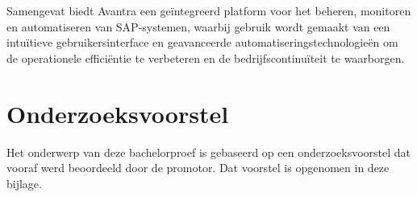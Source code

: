 \documentclass[dutch,dit,thesis]{hogentreport}
\begin{document}
Samengevat biedt Avantra een geïntegreerd platform voor het beheren, monitoren en automatiseren van SAP-systemen, waarbij gebruik wordt gemaakt van een intuïtieve gebruikersinterface en geavanceerde 
automatiseringstechnologieën om de operationele efficiëntie te verbeteren en de bedrijfscontinuïteit te waarborgen.




%
%

%


\appendix

\chapter{Onderzoeksvoorstel}

Het onderwerp van deze bachelorproef is gebaseerd op een onderzoeksvoorstel dat vooraf werd beoordeeld door de promotor. Dat voorstel is opgenomen in deze bijlage.



% 

%


\backmatter{}

\setlength\bibitemsep{2pt} %
\printbibliography[heading=bibintoc]
\end{document}
